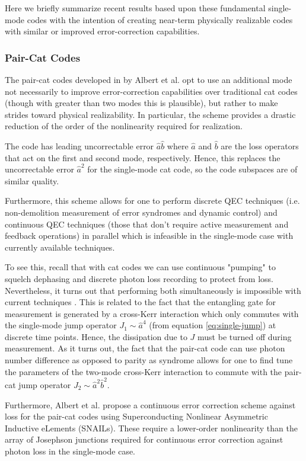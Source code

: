 \documentclass[12]{amsart}
\newcommand\0{\mathbf{0}}
\newcommand\<{\langle}
\renewcommand\>{\rangle}
\begin{document}
Here we briefly summarize recent results based upon these fundamental single-mode codes with the intention of creating near-term physically realizable codes with similar or improved error-correction capabilities.

\subsubsection{Pair-Cat Codes}\label{sec:multi-cat}

The pair-cat codes developed in \cite{albert2018multimode} by Albert et al. opt to use an additional mode not necessarily to improve error-correction capabilities over traditional cat codes (though with greater than two modes this is plausible), but rather to make strides toward physical realizability. In particular, the scheme provides a drastic reduction of the order of the nonlinearity required for realization. 

The code has leading uncorrectable error $\hat{a}\hat{b}$ where $\hat{a}$ and $\hat{b}$ are the loss operators that act on the first and second mode, respectively. Hence, this replaces the uncorrectable error $\hat{a}^2$ for the single-mode cat code, so the code subspaces are of similar quality.

Furthermore, this scheme allows for one to perform discrete QEC techniques (i.e. non-demolition measurement of error syndromes and dynamic control) and continuous QEC techniques (those that don't require active measurement and feedback operations) in parallel which is infeasible in the single-mode case with currently available techniques.

To see this, recall that with cat codes we can use continuous "pumping" to squelch dephasing and discrete photon loss recording to protect from loss. Nevertheless, it turns out that performing both simultaneously is impossible with current techniques \cite{albert2018multimode}. This is related to the fact that the entangling gate for measurement is generated by a cross-Kerr interaction which only commutes with the single-mode jump operator $J_1 \sim \hat{a}^4$ (from equation \ref{eq:single-jump}) at discrete time points. Hence, the dissipation due to $J$ must be turned off during measurement. As it turns out, the fact that the pair-cat code can use photon number difference as opposed to parity as syndrome allows for one to find tune the parameters of the two-mode cross-Kerr interaction to commute with the pair-cat jump operator $J_2 \sim \hat{a}^2\hat{b}^2$.

Furthermore, Albert et al. propose a continuous error correction scheme against loss for the pair-cat codes using Superconducting Nonlinear Asymmetric Inductive eLements (SNAILs)\cite{frattini20173}. These require a lower-order nonlinearity than the array of Josephson junctions required for continuous error correction against photon loss in the single-mode case.
\end{document}
